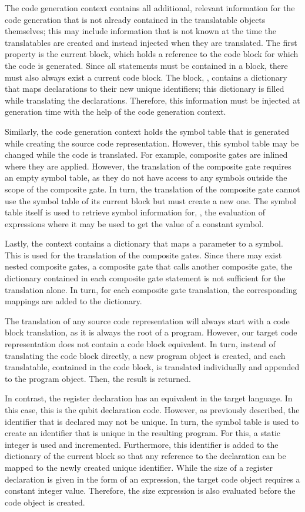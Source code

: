 The code generation context contains all additional, relevant information for the code generation that is not already contained in the translatable objects themselves; this may include information that is not known at the time the translatables are created and instead injected when they are translated. The first property is the current block, which holds a reference to the code block for which the code is generated. Since all statements must be contained in a block, there must also always exist a current code block. The block, \eg, contains a dictionary that maps declarations to their new unique identifiers; this dictionary is filled while translating the declarations. Therefore, this information must be injected at generation time with the help of the code generation context. 

Similarly, the code generation context holds the symbol table that is generated while creating the source code representation. However, this symbol table may be changed while the code is translated. For example, composite gates are inlined where they are applied. However, the translation of the composite gate requires an empty symbol table, as they do not have access to any symbols outside the scope of the composite gate. In turn, the translation of the composite gate cannot use the symbol table of its current block but must create a new one. The symbol table itself is used to retrieve symbol information for, \eg, the evaluation of expressions where it may be used to get the value of a constant symbol.

Lastly, the context contains a dictionary that maps a parameter to a symbol. This is used for the translation of the composite gates. Since there may exist nested composite gates, \ie a composite gate that calls another composite gate, the dictionary contained in each composite gate statement is not sufficient for the translation alone. In turn, for each composite gate translation, the corresponding mappings are added to the dictionary.

The translation of any source code representation will always start with a code block translation, as it is always the root of a program. However, our target code representation does not contain a code block equivalent. In turn, instead of translating the code block directly, a new program object is created, and each translatable, contained in the code block, is translated individually and appended to the program object. Then, the result is returned.

In contrast, the register declaration has an equivalent in the target language. In this case, this is the qubit declaration code. However, as previously described, the identifier that is declared may not be unique. In turn, the symbol table is used to create an identifier that is unique in the resulting program. For this, a static integer is used and incremented. Furthermore, this identifier is added to the dictionary of the current block so that any reference to the declaration can be mapped to the newly created unique identifier. While the size of a register declaration is given in the form of an expression, the target code object requires a constant integer value. Therefore, the size expression is also evaluated before the code object is created. 

